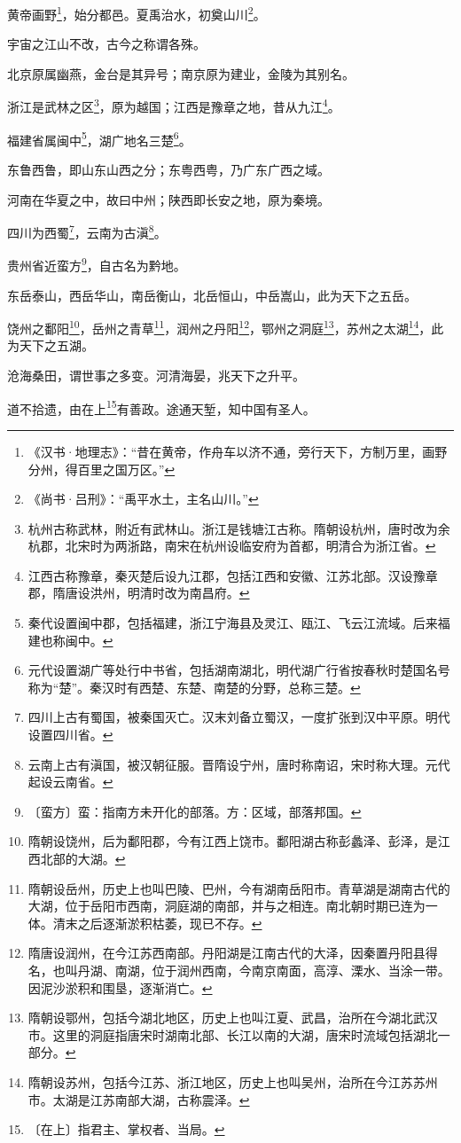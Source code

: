 \documentclass[12pt,UTF-8,openany]{ctexbook}
\begin{document}
\begin{normalsize}
    黄帝画野\footnote{《汉书·地理志》：“昔在黄帝，作舟车以济不通，旁行天下，方制万里，画野分州，得百里之国万区。”}，始分都邑。夏禹治水，初奠山川\footnote{《尚书·吕刑》：“禹平水土，主名山川。”}。
    
    宇宙之江山不改，古今之称谓各殊。
    
    北京原属幽燕，金台是其异号；南京原为建业，金陵为其别名。
    
    浙江是武林之区\footnote{杭州古称武林，附近有武林山。浙江是钱塘江古称。隋朝设杭州，唐时改为余杭郡，北宋时为两浙路，南宋在杭州设临安府为首都，明清合为浙江省。}，原为越国；江西是豫章之地，昔从九江\footnote{江西古称豫章，秦灭楚后设九江郡，包括江西和安徽、江苏北部。汉设豫章郡，隋唐设洪州，明清时改为南昌府。}。
    
    福建省属闽中\footnote{秦代设置闽中郡，包括福建，浙江宁海县及灵江、瓯江、飞云江流域。后来福建也称闽中。}，湖广地名三楚\footnote{元代设置湖广等处行中书省，包括湖南湖北，明代湖广行省按春秋时楚国名号称为“楚”。秦汉时有西楚、东楚、南楚的分野，总称三楚。}。
    
    东鲁西鲁，即山东山西之分；东粤西粤，乃广东广西之域。
    
    河南在华夏之中，故曰中州；陕西即长安之地，原为秦境。
    
    四川为西蜀\footnote{四川上古有蜀国，被秦国灭亡。汉末刘备立蜀汉，一度扩张到汉中平原。明代设置四川省。}，云南为古滇\footnote{云南上古有滇国，被汉朝征服。晋隋设宁州，唐时称南诏，宋时称大理。元代起设云南省。}。
    
    贵州省近蛮方\footnote{〔蛮方〕蛮：指南方未开化的部落。方：区域，部落邦国。}，自古名为黔地。
    
    东岳泰山，西岳华山，南岳衡山，北岳恒山，中岳嵩山，此为天下之五岳。
    
    饶州之鄱阳\footnote{隋朝设饶州，后为鄱阳郡，今有江西上饶市。鄱阳湖古称彭蠡泽、彭泽，是江西北部的大湖。}，岳州之青草\footnote{隋朝设岳州，历史上也叫巴陵、巴州，今有湖南岳阳市。青草湖是湖南古代的大湖，位于岳阳市西南，洞庭湖的南部，并与之相连。南北朝时期已连为一体。清末之后逐渐淤积枯萎，现已不存。}，润州之丹阳\footnote{隋唐设润州，在今江苏西南部。丹阳湖是江南古代的大泽，因秦置丹阳县得名，也叫丹湖、南湖，位于润州西南，今南京南面，高淳、溧水、当涂一带。因泥沙淤积和围垦，逐渐消亡。}，鄂州之洞庭\footnote{隋朝设鄂州，包括今湖北地区，历史上也叫江夏、武昌，治所在今湖北武汉市。这里的洞庭指唐宋时湖南北部、长江以南的大湖，唐宋时流域包括湖北一部分。}，苏州之太湖\footnote{隋朝设苏州，包括今江苏、浙江地区，历史上也叫吴州，治所在今江苏苏州市。太湖是江苏南部大湖，古称震泽。}，此为天下之五湖。
    
    沧海桑田，谓世事之多变。河清海晏，兆天下之升平。
    
    道不拾遗，由在上\footnote{〔在上〕指君主、掌权者、当局。}有善政。途通天堑，知中国有圣人。
    
\end{normalsize}
\end{document}
